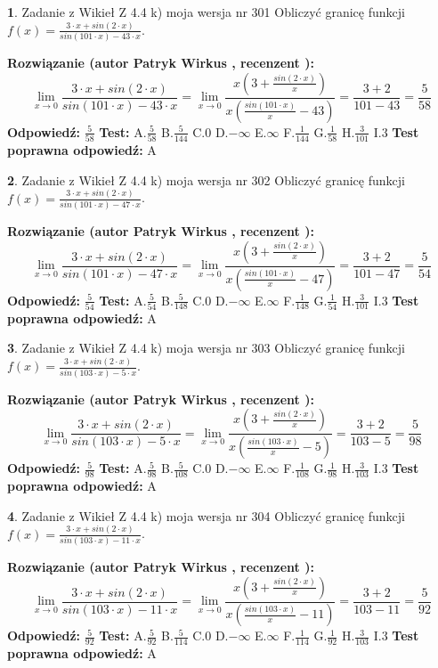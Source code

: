 \documentclass[12pt, a4paper]{article}
\theoremstyle{definition} %
\newtheorem{zad}{}
\newcommand{\zadStart}[1]{\begin{zad}#1\newline}
\newcommand{\zadStop}{\end{zad}}
\newcommand{\rozwStart}[2]{\noindent \textbf{Rozwiązanie (autor #1 , recenzent #2): }\newline}
\newcommand{\rozwStop}{\newline}
\newcommand{\odpStart}{\noindent \textbf{Odpowiedź:}\newline}
\newcommand{\odpStop}{\newline}
\newcommand{\testStart}{\noindent \textbf{Test:}\newline}
\newcommand{\testStop}{\newline}
\newcommand{\kluczStart}{\noindent \textbf{Test poprawna odpowiedź:}\newline}
\newcommand{\kluczStop}{\newline}
\begin{document}
\zadStart{Zadanie z Wikieł Z 4.4 k) moja wersja nr 301}
Obliczyć granicę funkcji $f(x)=\frac{3\cdot x +sin(2\cdot x)}{sin(101\cdot x) -43\cdot x}$.
\zadStop
\rozwStart{Patryk Wirkus}{}
$$\lim\limits_{x\to 0}\frac{3\cdot x +sin(2\cdot x)}{sin(101\cdot x) -43\cdot x}
=\lim\limits_{x\to 0}\frac{x(3+\frac{sin(2\cdot x)}{x})}{x(\frac{sin(101\cdot x)}{x}-43)}
=\frac{3+2}{101-43} = \frac{5}{58}$$
\rozwStop
\odpStart
$\frac{5}{58}$
\odpStop
\testStart
A.$\frac{5}{58}$
B.$\frac{5}{144}$
C.$0$
D.$-\infty$
E.$\infty$
F.$\frac{1}{144}$
G.$\frac{1}{58}$
H.$\frac{3}{101}$
I.$3$
\testStop
\kluczStart
A
\kluczStop



\zadStart{Zadanie z Wikieł Z 4.4 k) moja wersja nr 302}
Obliczyć granicę funkcji $f(x)=\frac{3\cdot x +sin(2\cdot x)}{sin(101\cdot x) -47\cdot x}$.
\zadStop
\rozwStart{Patryk Wirkus}{}
$$\lim\limits_{x\to 0}\frac{3\cdot x +sin(2\cdot x)}{sin(101\cdot x) -47\cdot x}
=\lim\limits_{x\to 0}\frac{x(3+\frac{sin(2\cdot x)}{x})}{x(\frac{sin(101\cdot x)}{x}-47)}
=\frac{3+2}{101-47} = \frac{5}{54}$$
\rozwStop
\odpStart
$\frac{5}{54}$
\odpStop
\testStart
A.$\frac{5}{54}$
B.$\frac{5}{148}$
C.$0$
D.$-\infty$
E.$\infty$
F.$\frac{1}{148}$
G.$\frac{1}{54}$
H.$\frac{3}{101}$
I.$3$
\testStop
\kluczStart
A
\kluczStop



\zadStart{Zadanie z Wikieł Z 4.4 k) moja wersja nr 303}
Obliczyć granicę funkcji $f(x)=\frac{3\cdot x +sin(2\cdot x)}{sin(103\cdot x) -5\cdot x}$.
\zadStop
\rozwStart{Patryk Wirkus}{}
$$\lim\limits_{x\to 0}\frac{3\cdot x +sin(2\cdot x)}{sin(103\cdot x) -5\cdot x}
=\lim\limits_{x\to 0}\frac{x(3+\frac{sin(2\cdot x)}{x})}{x(\frac{sin(103\cdot x)}{x}-5)}
=\frac{3+2}{103-5} = \frac{5}{98}$$
\rozwStop
\odpStart
$\frac{5}{98}$
\odpStop
\testStart
A.$\frac{5}{98}$
B.$\frac{5}{108}$
C.$0$
D.$-\infty$
E.$\infty$
F.$\frac{1}{108}$
G.$\frac{1}{98}$
H.$\frac{3}{103}$
I.$3$
\testStop
\kluczStart
A
\kluczStop



\zadStart{Zadanie z Wikieł Z 4.4 k) moja wersja nr 304}
Obliczyć granicę funkcji $f(x)=\frac{3\cdot x +sin(2\cdot x)}{sin(103\cdot x) -11\cdot x}$.
\zadStop
\rozwStart{Patryk Wirkus}{}
$$\lim\limits_{x\to 0}\frac{3\cdot x +sin(2\cdot x)}{sin(103\cdot x) -11\cdot x}
=\lim\limits_{x\to 0}\frac{x(3+\frac{sin(2\cdot x)}{x})}{x(\frac{sin(103\cdot x)}{x}-11)}
=\frac{3+2}{103-11} = \frac{5}{92}$$
\rozwStop
\odpStart
$\frac{5}{92}$
\odpStop
\testStart
A.$\frac{5}{92}$
B.$\frac{5}{114}$
C.$0$
D.$-\infty$
E.$\infty$
F.$\frac{1}{114}$
G.$\frac{1}{92}$
H.$\frac{3}{103}$
I.$3$
\testStop
\kluczStart
A
\kluczStop
\end{document}
